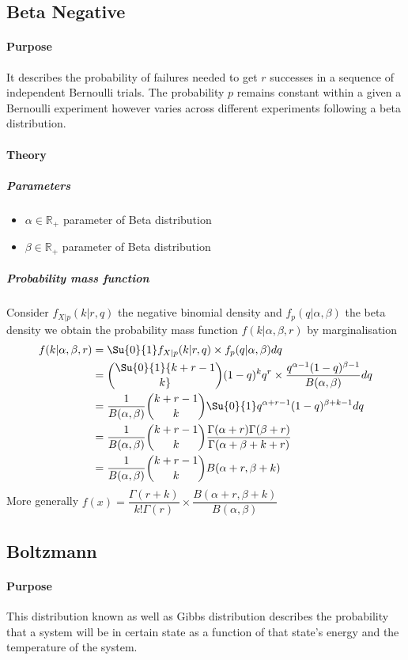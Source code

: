 \subsection{Beta Negative}
\paragraph{Purpose}
It describes the probability of failures needed to get $r$ successes in a sequence of independent
Bernoulli trials. The probability $p$ remains constant within a given a Bernoulli experiment however
varies across different experiments following a beta distribution.
\paragraph{Theory}
\subparagraph{Parameters}
\begin{itemize}
    \item $\alpha\in\mathbb{R}_{+}$ parameter of Beta distribution
    \item $\beta\in\mathbb{R}_{+}$ parameter of Beta distribution
\end{itemize}
\subparagraph{Probability mass function}
Consider $f_{X|p}(k|r, q)$ the negative binomial density and $f_{p}(q|\alpha,\beta)$ the beta density
we obtain the probability mass function $f(k|\alpha, \beta, r)$ by marginalisation
\begin{align*}
    f(k|\alpha,\beta,r) &= \Su{0}{1}f_{X|p}(k|r,q)\times f_{p}(q|\alpha, \beta)dq\\
                        &= \Su{0}{1}{k+r-1\choose k}(1-q)^{k}q^{r}\times \dfrac{q^{\alpha -1}(1-q)^{\beta -1}}{B(\alpha, \beta)}dq\\
                        &= \dfrac{1}{B(\alpha, \beta)}{k+r-1\choose k}\Su{0}{1}q^{\alpha + r-1}(1-q)^{\beta +k-1}dq\\
                        &= \dfrac{1}{B(\alpha, \beta)}{k+r-1\choose k}\dfrac{\Gamma(\alpha + r)\Gamma(\beta + r)}{\Gamma(\alpha + \beta + k + r)}\\
                        &= \dfrac{1}{B(\alpha, \beta)}{k+r-1\choose k}B(\alpha + r, \beta + k)
\end{align*}
More generally $f(x) = \dfrac{\Gamma(r+k)}{k!\Gamma(r)}\times\dfrac{B(\alpha + r, \beta + k)}{B(\alpha,\beta)}$

\subsection{Boltzmann}
\paragraph{Purpose}
This distribution known as well as Gibbs distribution describes the probability that a system will be
in certain state as a function of that state's energy and the temperature of the system.
